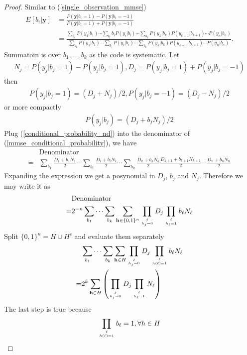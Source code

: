 \documentclass[12pt]{article}
\newcommand{\vect}[1]{\mathbf{#1}}
\begin{document}
\begin{proof}
Similar to (\ref{single_observation_mmse})
\begin{align}
E[b_i|\vect{y}] &= \frac{P(\vect{y}|b_i=1)-P(\vect{y}|b_i=-1)}{P(\vect{y}|b_i=1)+P(\vect{y}|b_i=-1)}\\
&=\frac{\sum_{b_1}P(y_1|b_1)\cdots\sum_{b_i}b_iP(y_i|b_i)\cdots\sum_{b_k}P(y_k|b_k)P(y_{k+1}|b_{k+1})\cdots P(y_n|b_n)}{\sum_{b_1}P(y_1|b_1)\cdots\sum_{b_i}P(y_i|b_i)\cdots\sum_{b_k}P(y_k|b_k)P(y_{k+1}|b_{k+1})\cdots P(y_n|b_n)}. \label{mmse_conditional_probability}
\end{align}
Summatoin is over $b_1, \ldots, b_k$ as the code is systematic. Let
\begin{align}
N_j = P(y_j|b_j=1)-P(y_j|b_j=1), D_j = P(y_j|b_j=1)+P(y_j|b_j=-1)
\end{align}
then
\begin{align}
P(y_j|b_j=1) = (D_j+N_j)/2, P(y_j|b_j=-1) = (D_j-N_j)/2
\end{align}
or more compactly
\begin{align}
P(y_j|b_j) = (D_j+b_jN_j)/2 \label{conditional_probability_nd}
\end{align}
Plug (\ref{conditional_probability_nd}) into the denominator of (\ref{mmse_conditional_probability}), we have
\begin{align}
&\text{Denominator}\\
=&\sum_{b_1}\frac{D_1+b_1N_1}{2}\cdots\sum_{b_i}\frac{D_i+b_iN_i}{2}\cdots\sum_{b_k}\frac{D_k+b_kN_k}{2}\frac{D_{k+1}+b_{k+1}N_{k+1}}{2}\cdots\frac{D_n+b_nN_n}{2}
\end{align}
Expanding the expression we get a posynomial in $D_j$, $b_j$ and $N_j$. Therefore we may write it as
\begin{align}
&\text{Denominator}\\
=&2^{-n}\sum_{b_1}\cdots\sum_{b_k}\sum_{\vect{h}\in \{0,1\}^n}\prod_{j\atop h_j = 0}D_j\prod_{\ell\atop h_\ell = 1}b_\ell N_\ell
\end{align}
Split $\{0,1\}^n=H\cup H^c$ and evaluate them separately
\begin{align}
&\sum_{b_1}\cdots\sum_{b_k}\sum_{\vect{h}\in H}\prod_{j\atop h_j = 0}D_j\prod_{\ell\atop h(\ell) = 1}b_\ell N_\ell\\
=&2^k\sum_{\vect{h}\in H}\left(\prod_{j\atop h_j = 0}D_j\prod_{\ell\atop h_\ell = 1} N_\ell\right)
\end{align}
The last step is true because
\begin{align}
\prod_{\ell\atop h(\ell) = 1}b_\ell =1, \forall h\in H

\end{align}
\end{proof}
\end{document}
